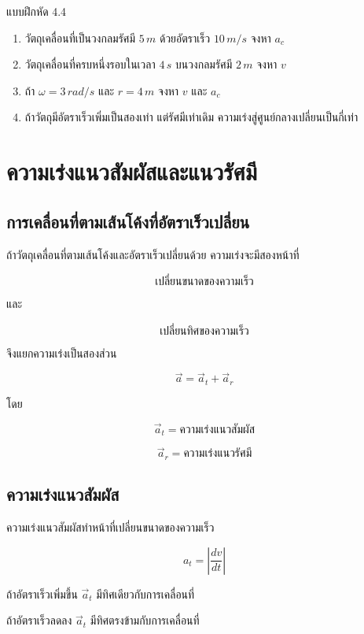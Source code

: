 \begin{exercisebox}{แบบฝึกหัด 4.4}
\begin{enumerate}
    \item วัตถุเคลื่อนที่เป็นวงกลมรัศมี $5\,\si{m}$ ด้วยอัตราเร็ว $10\,\si{m/s}$ จงหา $a_c$
    \item วัตถุเคลื่อนที่ครบหนึ่งรอบในเวลา $4\,\si{s}$ บนวงกลมรัศมี $2\,\si{m}$ จงหา $v$
    \item ถ้า $\omega=3\,\si{rad/s}$ และ $r=4\,\si{m}$ จงหา $v$ และ $a_c$
    \item ถ้าวัตถุมีอัตราเร็วเพิ่มเป็นสองเท่า แต่รัศมีเท่าเดิม ความเร่งสู่ศูนย์กลางเปลี่ยนเป็นกี่เท่า
\end{enumerate}
\end{exercisebox}

\section{ความเร่งแนวสัมผัสและแนวรัศมี}

\subsection{การเคลื่อนที่ตามเส้นโค้งที่อัตราเร็วเปลี่ยน}

ถ้าวัตถุเคลื่อนที่ตามเส้นโค้งและอัตราเร็วเปลี่ยนด้วย ความเร่งจะมีสองหน้าที่

\[
\text{เปลี่ยนขนาดของความเร็ว}
\]

และ

\[
\text{เปลี่ยนทิศของความเร็ว}
\]

จึงแยกความเร่งเป็นสองส่วน

\[
\vec{a}=\vec{a}_t+\vec{a}_r
\]

โดย

\[
\vec{a}_t=\text{ความเร่งแนวสัมผัส}
\]

\[
\vec{a}_r=\text{ความเร่งแนวรัศมี}
\]

\subsection{ความเร่งแนวสัมผัส}

ความเร่งแนวสัมผัสทำหน้าที่เปลี่ยนขนาดของความเร็ว

\[
a_t=\left|\frac{dv}{dt}\right|
\]

ถ้าอัตราเร็วเพิ่มขึ้น $\vec{a}_t$ มีทิศเดียวกับการเคลื่อนที่

ถ้าอัตราเร็วลดลง $\vec{a}_t$ มีทิศตรงข้ามกับการเคลื่อนที่

